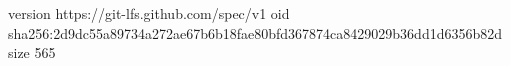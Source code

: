 version https://git-lfs.github.com/spec/v1
oid sha256:2d9dc55a89734a272ae67b6b18fae80bfd367874ca8429029b36dd1d6356b82d
size 565
